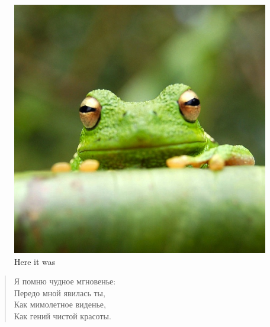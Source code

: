 \documentclass{article}
\begin{document}
\begin{figure}
    \centering
    \includegraphics[scale=.2]{frog.jpg}
    \caption{Here it was}
    \label{frog}
\end{figure}

\begin{quote}
  Я помню чудное мгновенье:\\
  Передо мной явилась ты,\\
  Как мимолетное виденье,\\
  Как гений чистой красоты.
\end{quote}
\end{document}
